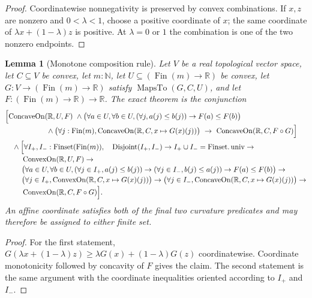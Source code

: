 \documentclass[9pt]{extarticle}
\newtheorem{lemma}{Lemma}[section]
\theoremstyle{definition}
\theoremstyle{remark}
\newcommand{\R}{\mathbb R}
\newcommand{\N}{\mathbb N}
\begin{document}
\begin{proof}
Coordinatewise nonnegativity is preserved by convex combinations.  If
$x,z$ are nonzero and $0<\lambda<1$, choose a positive coordinate of $x$;
the same coordinate of $\lambda x+(1-\lambda)z$ is positive.  At
$\lambda=0$ or $1$ the combination is one of the two nonzero endpoints.
\end{proof}

\begin{lemma}[Monotone composition rule]\label{lem:composition-rule}
Let $V$ be a real topological vector space, let $C\subseteq V$ be convex,
let $m:\N$, let $U\subseteq(\operatorname{Fin}(m)\to\R)$ be convex, let
$G:V\to(\operatorname{Fin}(m)\to\R)$ satisfy
$\operatorname{MapsTo}(G,C,U)$, and let
$F:(\operatorname{Fin}(m)\to\R)\to\R$.  The exact theorem is the
conjunction
\begin{align*}
&\Bigl[
 \operatorname{ConcaveOn}(\R,U,F)\ 
 \wedge
 \bigl(\forall a\in U,\forall b\in U,
   (\forall j,a(j)\leq b(j))\to F(a)\leq F(b)\bigr)\\[-2pt]
&\hspace{20mm}{}\wedge
 \bigl(\forall j:\operatorname{Fin}(m),
   \operatorname{ConcaveOn}(\R,C,x\mapsto G(x)(j))\bigr)
 \ \to\ \operatorname{ConcaveOn}(\R,C,F\circ G)
 \Bigr]\\
&\quad\wedge\Bigl[
 \forall I_+,I_-:\operatorname{Finset}(\operatorname{Fin}(m)),\quad
 \operatorname{Disjoint}(I_+,I_-)\to
 I_+\cup I_-=\operatorname{Finset.univ}\to\\[-2pt]
&\hspace{8mm}
 \operatorname{ConvexOn}(\R,U,F)\to\\[-2pt]
&\hspace{8mm}
 \bigl(\forall a\in U,\forall b\in U,
   (\forall j\in I_+,a(j)\leq b(j))\to
   (\forall j\in I_-,b(j)\leq a(j))\to F(a)\leq F(b)\bigr)\to\\[-2pt]
&\hspace{8mm}
 \bigl(\forall j\in I_+,
   \operatorname{ConvexOn}(\R,C,x\mapsto G(x)(j))\bigr)\to
 \bigl(\forall j\in I_-,
   \operatorname{ConcaveOn}(\R,C,x\mapsto G(x)(j))\bigr)\to\\[-2pt]
&\hspace{8mm}
 \operatorname{ConvexOn}(\R,C,F\circ G)
 \Bigr].
\end{align*}
An affine coordinate satisfies both of the final two curvature predicates
and may therefore be assigned to either finite set.
\end{lemma}

\begin{proof}
For the first statement,
$G(\lambda x+(1-\lambda)z)\geq\lambda G(x)+(1-\lambda)G(z)$ coordinatewise.
Coordinate monotonicity followed by concavity of $F$ gives the claim. The
second statement is the same argument with the coordinate inequalities
oriented according to $I_+$ and $I_-$.
\end{proof}
\end{document}
